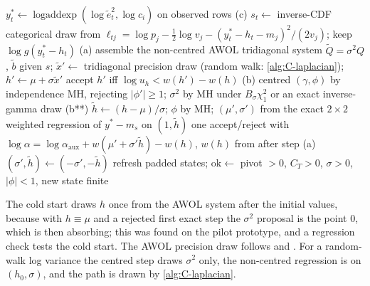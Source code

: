\begin{algorithm}[!htbp]
\caption{SV update of one equation, AR(1) log-volatility, with the exact correction and ASIS
(, ). Steps (c), (a), (b) and (b**) follow the design
document; $w(\cdot)$ is~\eqref{eq:B-w}.}
\label{alg:C-sv}\label{alg:sv}%
\footnotesize
\begin{algorithmic}[1]
\State $y^*_t \gets \operatorname{logaddexp}(\log\tilde e_t^2, \log c_i)$ on observed rows 
\State (c) $s_t \gets$ inverse-CDF categorical draw from $\ell_{tj} = \log p_j - \frac12\log v_j - (y^*_t - h_t - m_j)^2/(2v_j)$; keep $\log g(y^*_t - h_t)$
\State (a) assemble the non-centred AWOL tridiagonal system $\tilde Q = \sigma^2 Q$, $\tilde b$ given $s$; $\tilde x' \gets$ tridiagonal precision draw (random walk: \cref{alg:C-laplacian}); $h' \gets \mu + \sigma\tilde x'$
 accept $h'$ iff $\log u_h < w(h') - w(h)$ 
\EndIf
\State (b) centred $(\gamma, \phi)$ by independence MH, rejecting $|\phi'| \ge 1$; $\sigma^2$ by MH under $B_\sigma\chi^2_1$ or an exact inverse-gamma draw
\State (b**) $\tilde h \gets (h - \mu)/\sigma$; $\phi$ by MH; $(\mu', \sigma')$ from the exact $2\times2$ weighted regression of $y^* - m_s$ on $(1, \tilde h)$
 one accept/reject with $\log\alpha = \log\alpha_{\mathrm{aux}} + w(\mu' + \sigma'\tilde h) - w(h)$, $w(h)$ from after step (a)
\EndIf
{} $(\sigma', \tilde h) \gets (-\sigma', -\tilde h)$ 
\EndIf
\State refresh padded states; $\mathrm{ok} \gets$ pivot $> 0$, $C_T > 0$, $\sigma > 0$, $|\phi| < 1$, new state finite
\end{algorithmic}
\end{algorithm}

The cold start draws $h$ once from the AWOL system after the initial values, because with $h \equiv
\mu$ and a rejected first exact step the $\sigma^2$ proposal is the point 0, which is then absorbing;
this was found on the pilot prototype, and a regression check tests the cold start.
The AWOL precision draw follows \citet{chan2009efficient} and \citet{mccausland2011simulation}.
For a random-walk log variance the centred step draws $\sigma^2$ only, the non-centred regression
is on $(h_0, \sigma)$, and the path is drawn by \cref{alg:C-laplacian}. %

